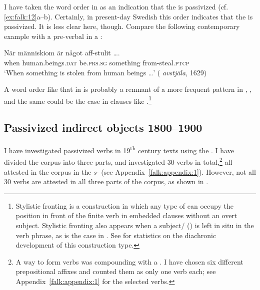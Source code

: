 \documentclass[output=paper]{langscibook}
\begin{document}
I have taken the word order in  as an indication that the  is passivized (cf. \ref{ex:falk:12}a–b). Certainly, in present-day Swedish this order indicates that the  is passivized. It is less clear here, though. Compare the following contemporary example with a pre-verbal   in a :\largerpage

\ea%
    \label{ex:falk:18}
\gll När  människiom      är        något      aff-stulit …. \\
    when  human.beings\textsc{.dat}  be.\textsc{prs.sg}  something  from-steal.\textsc{ptcp}\\
\glt ‘When something is stolen from human beings …’ ( \textit{avstjäla}, 1629)
\z


A word order like that in  is probably a remnant of a more frequent pattern in , , and the same could be the case in clauses like .\footnote{Stylistic fronting is a construction in which any type of  can occupy the position in front of the finite verb in embedded clauses without an overt subject. Stylistic fronting also appears when a subject/ () is left in situ in the verb phrase, as is the case in . See \citet[326]{Falk1993} for statistics on the diachronic development of this construction type.}

\subsection{Passivized indirect objects 1800–1900}\label{sec:falk:3.5}


I have investigated passivized  verbs in 19\textsuperscript{th} century texts using the . I have divided the corpus into three parts, and investigated 30  verbs in total,\footnote{A  way to form  verbs was compounding with a . I have chosen six different prepositional affixes and counted them as only one verb each; see Appendix~\ref{falk:appendix:1} for the selected verbs.\label{fn:02:15}} all attested in the corpus in the \textit{s}{}- (see Appendix~\ref{falk:appendix:1}). However, not all 30 verbs are attested in all three parts of the corpus, as shown in .
\end{document}
